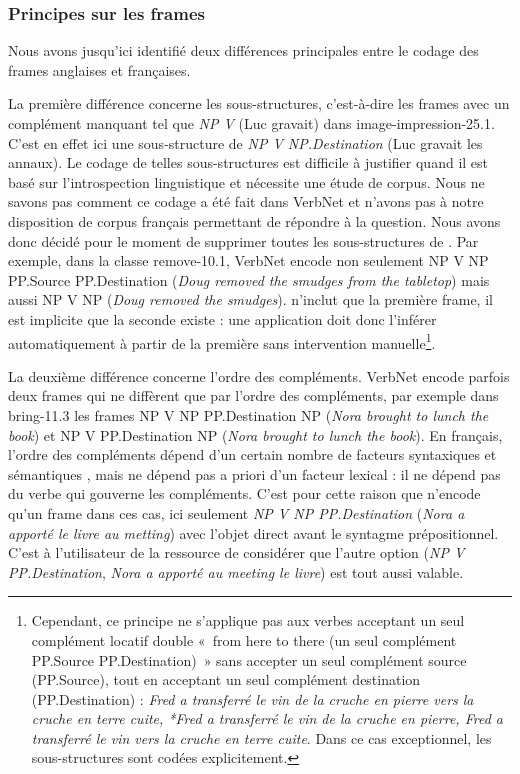 \subsubsection{Principes sur les frames}\label{princp}

Nous avons jusqu'ici identifié deux différences principales entre le codage des
frames anglaises et françaises.

La première différence concerne les sous-structures, c'est-à-dire les frames
avec un complément manquant tel que \emph{NP V} (Luc gravait) dans
{\color{blue}image-impression-25.1}. C'est en effet ici une sous-structure de
\emph{NP V NP.Destination} (Luc gravait les annaux). Le codage de telles
sous-structures est difficile à justifier quand il est basé sur l'introspection
linguistique et nécessite une étude de corpus. Nous ne savons pas comment ce
codage a été fait dans VerbNet et n'avons pas à notre disposition de corpus
français permettant de répondre à la question. Nous avons donc décidé pour le
moment de supprimer toutes les sous-structures de \verbenet{}. Par exemple,
dans la classe {\color{blue}remove-10.1}, VerbNet encode non seulement NP V NP
PP.Source PP.Destination (\emph{Doug removed the smudges from the tabletop})
mais aussi NP V NP (\emph{Doug removed the smudges}). \verbenet{} n'inclut que
la première frame, il est implicite que la seconde existe : une application
doit donc l'inférer automatiquement à partir de la première sans intervention
manuelle\footnote{Cependant, ce principe ne s'applique pas aux verbes acceptant
un seul complément locatif double «~from here to there (un seul
complément PP.Source PP.Destination)~» sans accepter un seul complément source
(PP.Source), tout en acceptant un seul complément destination
(PP.Destination) : \emph{Fred a transferré le vin de la cruche en pierre vers
la cruche en terre cuite, *Fred a transferré le vin de la cruche en pierre,
Fred a transferré le vin vers la cruche en terre cuite}. Dans ce cas
exceptionnel, les sous-structures sont codées explicitement.}.

La deuxième différence concerne l'ordre des compléments. VerbNet encode parfois
deux frames qui ne diffèrent que par l'ordre des compléments, par exemple dans
{\color{blue}bring-11.3} les frames NP V NP PP.Destination NP (\emph{Nora
brought to lunch the book}) et NP V PP.Destination NP (\emph{Nora brought to
lunch the book}). En français, l'ordre des compléments dépend d'un certain
nombre de facteurs syntaxiques et sémantiques \citep{thuilier2012contraintes},
mais ne dépend pas a priori d'un facteur lexical : il ne dépend pas du verbe
qui gouverne les compléments. C'est pour cette raison que \verbenet{} n'encode
qu'un frame dans ces cas, ici seulement \emph{NP V NP PP.Destination}
(\emph{Nora a apporté le livre au metting}) avec l'objet direct avant le
syntagme prépositionnel. C'est à l'utilisateur de la ressource de considérer
que l'autre option (\emph{NP V PP.Destination}, \emph{Nora a apporté au meeting
le livre}) est tout aussi valable.

